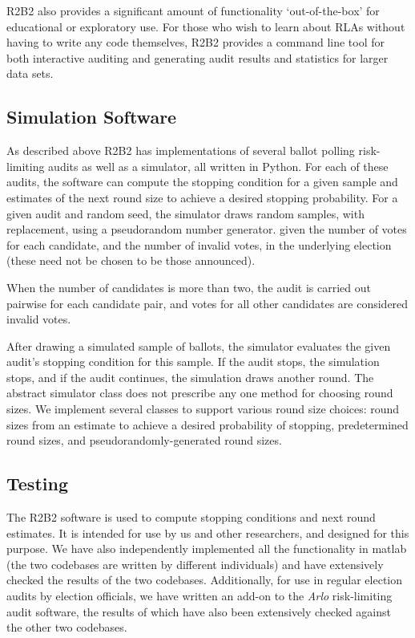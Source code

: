 
R2B2 also provides a significant amount of functionality `out-of-the-box' for educational
or exploratory use. For those who wish to learn about RLAs without having to write any
code themselves, R2B2 provides a command line tool for both interactive auditing and
generating audit results and statistics for larger data sets.

\subsection{Simulation Software}
As described above R2B2 has implementations of several ballot polling risk-limiting audits as well as a simulator, 
all written in Python.
For each of these audits, the software can compute the stopping condition for a given sample and estimates
of the next round size to achieve a desired stopping probability. 
For a given audit and random seed, the simulator draws random samples, with replacement, using a pseudorandom number generator.
given the number of votes for each candidate, and the number of invalid votes, in the underlying election (these need not be chosen to be those announced). 

When the number of candidates is more than two, the audit is carried out pairwise for each candidate pair, and votes for all other candidates are considered invalid votes. 

After drawing a simulated sample of ballots, the simulator evaluates the given audit's stopping condition for this sample.
If the audit stops, the simulation stops, and if the audit continues, the simulation draws another round. 
The abstract simulator class does not prescribe any one method for choosing round sizes. 
We implement several classes to support various round size choices: 
round sizes from an estimate to achieve a desired probability of stopping, 
predetermined round sizes, and pseudorandomly-generated round sizes. 

\subsection{Testing}

The R2B2 software is used to compute stopping conditions and next round estimates. It is intended for use by us and other researchers, and designed for this purpose. We have also independently implemented all the functionality in matlab \cite{brla_explore_anon} (the two codebases are written by different individuals) and have extensively checked the results of the two codebases. Additionally, for use in regular election audits by election officials, we have written an add-on \cite{athena_anon} to the {\em Arlo} risk-limiting audit software, the results of which have also been extensively checked against the other two codebases. 



